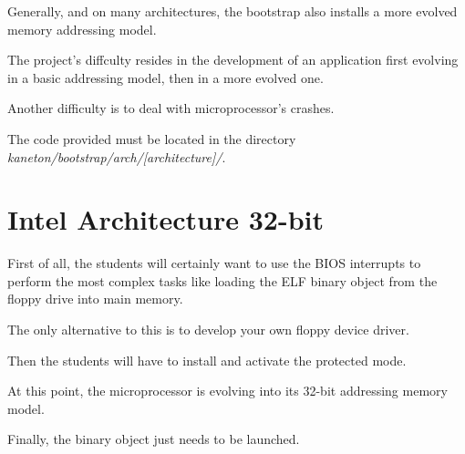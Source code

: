 Generally, and on many architectures, the bootstrap also installs
a more evolved memory addressing model.

The project's diffculty resides in the development of an
application first evolving in a basic addressing model, then in
a more evolved one.

Another difficulty is to deal with microprocessor's crashes.

The code provided must be located in the directory
\textit{kaneton/bootstrap/arch/[architecture]/}.

%
%

\section{Intel Architecture 32-bit}

First of all, the students will certainly want to use the BIOS interrupts
to perform the most complex tasks like loading the ELF binary object
from the floppy drive into main memory.

The only alternative to this is to develop your own floppy device driver.

Then the students will have to install and activate the protected mode.

At this point, the microprocessor is evolving into its 32-bit addressing
memory model.

Finally, the binary object just needs to be launched.
